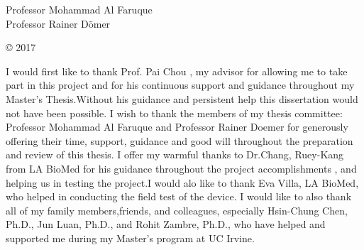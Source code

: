 



\othercommitteemembers
{
  Professor Mohammad Al Faruque\\
  Professor Rainer Dömer
}


\copyrightdeclaration
{
  {\copyright} {2017} \Authorname
}


  

\acknowledgments
{
  I would first like to thank Prof. Pai Chou , my advisor for allowing me to take part in this project and for his continuous support and guidance throughout my Master's Thesis.Without his guidance and persistent help this dissertation would not have been possible. I wish to thank the members of my thesis committee: Professor Mohammad Al Faruque and Professor Rainer Doemer for generously
  offering their time, support, guidance and good will throughout the
  preparation and review of this thesis. I offer my warmful thanks to Dr.Chang, Ruey-Kang from LA BioMed for his guidance throughout the project accomplishments , and helping us in testing the project.I would alo like to thank Eva Villa, LA BioMed, who helped in conducting the field test of the device. I would like to also thank all of my family members,friends, and colleagues, especially  Hsin-Chung Chen, Ph.D., Jun Luan, Ph.D., and Rohit Zambre, Ph.D.,
  who have helped and supported me during my Master's program at UC Irvine.   
}


